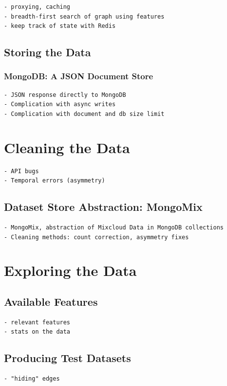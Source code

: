 \documentclass[a4paper,12pt,twoside,notitlepage]{report}
\begin{document}
\begin{verbatim}
- proxying, caching
- breadth-first search of graph using features
- keep track of state with Redis 
\end{verbatim}

\subsection{Storing the Data}

\subsubsection{MongoDB: A JSON Document Store}
\begin{verbatim}
- JSON response directly to MongoDB
- Complication with async writes
- Complication with document and db size limit
\end{verbatim}

\section{Cleaning the Data}

\begin{verbatim}
- API bugs
- Temporal errors (asymmetry)
\end{verbatim}

\subsection{Dataset Store Abstraction: MongoMix}


\begin{verbatim}
- MongoMix, abstraction of Mixcloud Data in MongoDB collections
- Cleaning methods: count correction, asymmetry fixes
\end{verbatim}

\section{Exploring the Data}

\subsection{Available Features}
\begin{verbatim}
- relevant features
- stats on the data
\end{verbatim}

\subsection{Producing Test Datasets}
\begin{verbatim}
- "hiding" edges
\end{verbatim}
\end{document}

